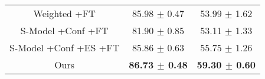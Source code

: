 \begin{table}[t]
\begin{center}
{\begin{small}
\begin{sc}
\begin{tabular}{ccc}
Weighted +FT                      & 85.98 $\pm$ 0.47            & 53.99 $\pm$ 1.62              \\
S-Model +Conf +FT                 & 81.90 $\pm$ 0.85            & 53.11 $\pm$ 1.33              \\
S-Model +Conf +ES +FT             & 85.86 $\pm$ 0.63            & 55.75 $\pm$ 1.26              \\
Ours                              & \textbf{86.73 $\pm$ 0.48}   & \textbf{59.30 $\pm$ 0.60}     \\
\bottomrule
\end{tabular}
\end{sc}
\end{small}
}
\end{center}
\vskip -0.1in
\end{table}